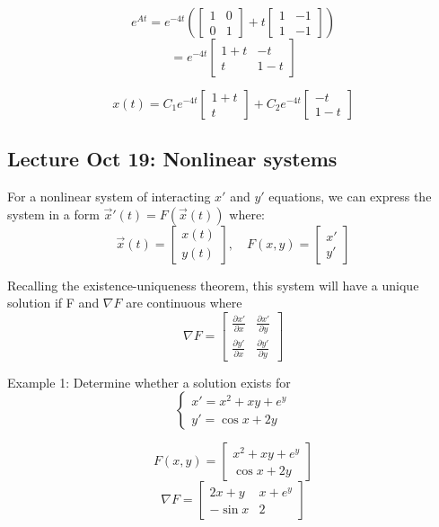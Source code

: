 \documentclass[12pt]{article}
\begin{document}
\[e^{At} = e^{-4t}\left(\begin{bmatrix}
    1 & 0\\
    0 & 1
\end{bmatrix} + t\begin{bmatrix}
    1 & -1\\
    1 & -1
\end{bmatrix}\right)\]
\[= e^{-4t} \begin{bmatrix}
    1 + t & -t\\
    t & 1 -t
\end{bmatrix}\]

\[\boxed{x(t) = C_1 e^{-4t} \begin{bmatrix}
    1 + t\\
    t
\end{bmatrix} + C_2 e^{-4t} \begin{bmatrix}
    -t \\
    1- t
\end{bmatrix}}\]

\subsection*{Lecture Oct 19: Nonlinear systems}
For a nonlinear system of interacting $x'$ and $y'$ equations, we can express the system in a form $\vec{x}'(t) = F(\vec{x}(t))$ where:
\[\vec{x}(t) = \begin{bmatrix}
    x(t)\\
    y(t)
\end{bmatrix}, \quad F(x, y) = \begin{bmatrix}
    x'\\
    y'
\end{bmatrix}\]

Recalling the existence-uniqueness theorem, this system will have a unique solution if F and $\nabla F$ are continuous where 
\[\nabla F = \begin{bmatrix}
    \frac{\partial x'}{\partial x} & \frac{\partial x'}{\partial y}\\
    \frac{\partial y'}{\partial x} & \frac{\partial y'}{\partial y}
\end{bmatrix}\]

Example 1: Determine whether a solution exists for 
\[\begin{cases}
    x' = x^2 + xy + e^y\\
    y' = \cos x + 2y
\end{cases}\]

\[F(x, y) = \begin{bmatrix}
    x^2 + xy + e^y\\
    \cos x + 2y
\end{bmatrix}\]
\[\nabla F = \begin{bmatrix}
    2x + y & x + e^y\\
    -\sin x & 2
\end{bmatrix}\]
\end{document}
